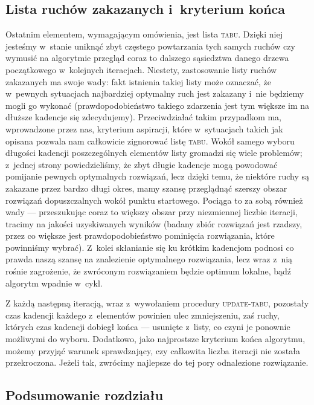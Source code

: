 \subsection{Lista ruchów zakazanych i~kryterium końca}

Ostatnim elementem, wymagającym omówienia, jest lista \textsc{tabu}. Dzięki niej jesteśmy w~stanie uniknąć zbyt częstego powtarzania tych samych ruchów czy wymusić na algorytmie przegląd coraz to dalszego sąsiedztwa danego drzewa początkowego w~kolejnych iteracjach. Niestety, zastosowanie listy ruchów zakazanych ma swoje wady: fakt istnienia takiej listy może oznaczać, że w~pewnych sytuacjach najbardziej optymalny ruch jest zakazany i~nie będziemy mogli go wykonać (prawdopodobieństwo takiego zdarzenia jest tym większe im na dłuższe kadencje się zdecydujemy). Przeciwdziałać takim przypadkom ma, wprowadzone przez nas, kryterium aspiracji, które w~sytuacjach takich jak opisana pozwala nam całkowicie zignorować listę \textsc{tabu}. Wokół samego wyboru długości kadencji poszczególnych elementów listy gromadzi się wiele problemów; z~jednej strony powiedzieliśmy, że zbyt długie kadencje mogą powodować pomijanie pewnych optymalnych rozwiązań, lecz dzięki temu, że niektóre ruchy są zakazane przez bardzo długi okres, mamy szansę przeglądnąć szerszy obszar rozwiązań dopuszczalnych wokół punktu startowego. Pociąga to za sobą również wady --- przeszukując coraz to większy obszar przy niezmiennej liczbie iteracji, tracimy na jakości uzyskiwanych wyników (badany zbiór rozwiązań jest rzadszy, przez co większe jest prawdopodobieństwo pominięcia rozwiązania, które powinniśmy wybrać). Z~kolei skłanianie się ku krótkim kadencjom podnosi co prawda naszą szansę na znalezienie optymalnego rozwiązania, lecz wraz z~nią rośnie zagrożenie, że zwróconym rozwiązaniem będzie optimum lokalne, bądź algorytm wpadnie w~cykl.

Z każdą następną iteracją, wraz z~wywołaniem procedury \textsc{update-tabu}, pozostały czas kadencji każdego z~elementów powinien ulec zmniejszeniu, zaś ruchy, których czas kadencji dobiegł końca --- usunięte z~listy, co czyni je ponownie możliwymi do wyboru. Dodatkowo, jako najprostsze kryterium końca algorytmu, możemy przyjąć warunek sprawdzający, czy całkowita liczba iteracji nie została przekroczona. Jeżeli tak, zwrócimy najlepsze do tej pory odnalezione rozwiązanie.

\subsection{Podsumowanie rozdziału}


